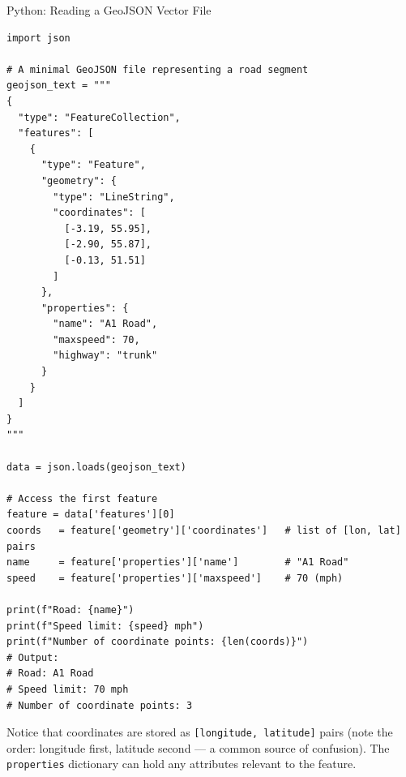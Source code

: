 \documentclass[aspectratio=169,10pt]{beamer}
\begin{document}
\begin{frame}[fragile]{Python: Reading a GeoJSON Vector File}

\begin{lstlisting}[caption={GeoJSON structure and reading it with Python}]
import json

# A minimal GeoJSON file representing a road segment
geojson_text = """
{
  "type": "FeatureCollection",
  "features": [
    {
      "type": "Feature",
      "geometry": {
        "type": "LineString",
        "coordinates": [
          [-3.19, 55.95],
          [-2.90, 55.87],
          [-0.13, 51.51]
        ]
      },
      "properties": {
        "name": "A1 Road",
        "maxspeed": 70,
        "highway": "trunk"
      }
    }
  ]
}
"""

data = json.loads(geojson_text)

# Access the first feature
feature = data['features'][0]
coords   = feature['geometry']['coordinates']   # list of [lon, lat] pairs
name     = feature['properties']['name']        # "A1 Road"
speed    = feature['properties']['maxspeed']    # 70 (mph)

print(f"Road: {name}")
print(f"Speed limit: {speed} mph")
print(f"Number of coordinate points: {len(coords)}")
# Output:
# Road: A1 Road
# Speed limit: 70 mph
# Number of coordinate points: 3
\end{lstlisting}

  Notice that coordinates are stored as \texttt{[longitude, latitude]}
  pairs (note the order: longitude first, latitude second --- a common
  source of confusion).  The \texttt{properties} dictionary can hold
  any attributes relevant to the feature.

\end{frame}
\end{document}
